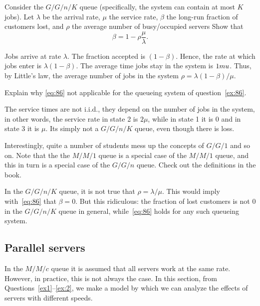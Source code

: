 \begin{exercise}[201807]{1}
  Consider the $G/G/n/K$ queue (specifically, the system can contain at most $K$ jobs).
  Let $\lambda$ be the arrival rate, $\mu$ the service rate, $\beta$ the long-run fraction of customers lost, and $\rho$ the average number of busy/occupied servers Show that
  \begin{equation}\label{eq:86}
    \beta = 1 - \rho\frac{\mu}{\lambda}.
  \end{equation}
\begin{solution}
    Jobs arrive at rate $\lambda$.
    The fraction accepted is $(1-\beta)$.
    Hence, the rate at which jobs enter is $\lambda(1-\beta)$. The average time jobs stay in the system is $1\\mu$. Thus, by Little's law, the average number of jobs in the system $\rho=\lambda(1-\beta)/\mu$. 
\end{solution}
\end{exercise}


\begin{exercise}[201807]{1}
  Explain why \cref{eq:86} not applicable for the queueing system of question~\cref{ex:86}.
\begin{solution}
    The service times are not i.i.d., they depend on the number of jobs in the system, in other words, the service rate in state 2 is $2\mu$, while in state 1 it is 0 and in state 3 it is $\mu$. Its simply not a $G/G/n/K$ queue, even though there is loss. 


Interestingly, quite a number of students mess up the concepts of $G/G/1$ and so on. Note that the the $M/M/1$ queue is a special case of the $M/M/1$ queue, and this in turn is a special case of the $G/G/n$ queue. Check out the definitions in the book.

In the $G/G/n/K$ queue, it is not true that $\rho=\lambda/\mu$. This would imply with~\cref{eq:86} that $\beta=0$. But this ridiculous: the fraction of lost customers is not 0 in the $G/G/n/K$ queue in general, while~\cref{eq:86} holds for any such queueing system. 
\end{solution}
\end{exercise}

\subsection{Parallel servers}
\label{sec:parallel-servers}

In the $M/M/c$ queue it is assumed that all servers work at the same rate.
However, in practice, this is not always the case.
In this section, from Questions~\ref{ex1}--\ref{ex:2}, we make a model by which we can analyze the effects of servers with different speeds.

